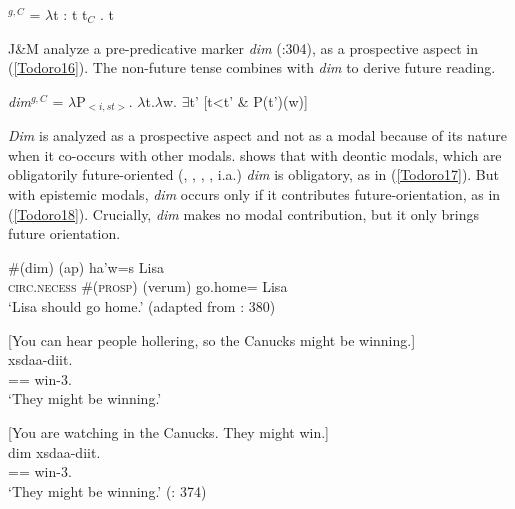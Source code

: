 \documentclass[output=paper]{langscibook}
\begin{document}
\begin{exe}
\ex \label{Todoro15}
\textlbrackdbl{}\textrbrackdbl$^{g,C}$ = {$\lambda$}t : t {\leq} t$_{C}$ . t
\end{exe}

J\&M analyze a pre-predicative marker \emph{dim} (\citealt{rigsby1986a}:304), as a prospective aspect in (\ref{Todoro16}). The non-future tense combines with \textit{dim} to derive future reading.

\begin{exe}
\ex \label{Todoro16}
\textlbrackdbl\emph{dim}\textrbrackdbl$^{g,C}$ = {$\lambda$}P$_{<i,st>}$. {$\lambda$}t.{$\lambda$}w. {$\exists$}t' [t<t’ \& P(t’)(w)] \\
\end{exe}

\emph{Dim} is analyzed as a prospective aspect and not as a modal because of its nature when it co-occurs with other modals. \citet{matthewson2013a} shows that with deontic modals, which are obligatorily future-oriented (\citealt{abusch2012a}, \citealt{thomas2014a}, \citealt{klecha2011a}, \citealt{chen2017a}, i.a.)  \emph{dim} is obligatory, as in (\ref{Todoro17}). But with epistemic modals, \emph{dim} occurs only if it contributes future-orientation, as in (\ref{Todoro18}). Crucially, \emph{dim} makes no modal contribution, but it only brings future orientation.

\begin{exe}
\ex \label{Todoro17}
 \#({dim}) ({ap}) {ha'w=s} {Lisa} \\
    \textsc{circ.necess} \#(\textsc{prosp}) (\tsc{}verum) go.home={\pn} Lisa\\
\glt `Lisa should go home.' (adapted from \citealt{matthewson2013a}: 380) 
\end{exe}

\begin{exe}
\ex \label{Todoro18}
\begin{xlist}

\ex \label{Todoro18a} [{You can hear people hollering, so the Canucks might be winning.}] \\
	{xsdaa-diit}. \\
    =={\cn} win-3{\pl}.{\seriesII} \\
\glt `They might be winning.' 

\ex \label{Todoro18b} [{You are watching in the Canucks. They might win.}]\\
 {dim} {xsdaa-diit}. \\
    =={\cn}  win-3{\pl}.{\seriesII} \\
\glt `They might be winning.' (\citealt{matthewson2013a}: 374)

\end{xlist}
\end{exe}
\end{document}
